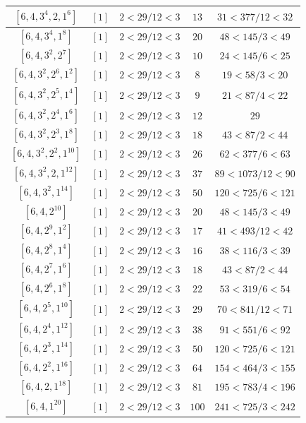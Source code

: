 \documentclass{article}%
\begin{document}
\begin{center}
\begin{longtable}{||c|c|c|c|c||}
$[6, 4, 3^{4}, 2, 1^{6}]$ & $[1]$ & $2 < 29/12 < 3$ & $13$ & $31 < 377/12 < 32$ \\ \hline 
$[6, 4, 3^{4}, 1^{8}]$ & $[1]$ & $2 < 29/12 < 3$ & $20$ & $48 < 145/3 < 49$ \\ \hline 
$[6, 4, 3^{2}, 2^{7}]$ & $[1]$ & $2 < 29/12 < 3$ & $10$ & $24 < 145/6 < 25$ \\ \hline 
$[6, 4, 3^{2}, 2^{6}, 1^{2}]$ & $[1]$ & $2 < 29/12 < 3$ & $8$ & $19 < 58/3 < 20$ \\ \hline 
$[6, 4, 3^{2}, 2^{5}, 1^{4}]$ & $[1]$ & $2 < 29/12 < 3$ & $9$ & $21 < 87/4 < 22$ \\ \hline 
$[6, 4, 3^{2}, 2^{4}, 1^{6}]$ & $[1]$ & $2 < 29/12 < 3$ & $12$ & $29$ \\ \hline 
$[6, 4, 3^{2}, 2^{3}, 1^{8}]$ & $[1]$ & $2 < 29/12 < 3$ & $18$ & $43 < 87/2 < 44$ \\ \hline 
$[6, 4, 3^{2}, 2^{2}, 1^{10}]$ & $[1]$ & $2 < 29/12 < 3$ & $26$ & $62 < 377/6 < 63$ \\ \hline 
$[6, 4, 3^{2}, 2, 1^{12}]$ & $[1]$ & $2 < 29/12 < 3$ & $37$ & $89 < 1073/12 < 90$ \\ \hline 
$[6, 4, 3^{2}, 1^{14}]$ & $[1]$ & $2 < 29/12 < 3$ & $50$ & $120 < 725/6 < 121$ \\ \hline 
$[6, 4, 2^{10}]$ & $[1]$ & $2 < 29/12 < 3$ & $20$ & $48 < 145/3 < 49$ \\ \hline 
$[6, 4, 2^{9}, 1^{2}]$ & $[1]$ & $2 < 29/12 < 3$ & $17$ & $41 < 493/12 < 42$ \\ \hline 
$[6, 4, 2^{8}, 1^{4}]$ & $[1]$ & $2 < 29/12 < 3$ & $16$ & $38 < 116/3 < 39$ \\ \hline 
$[6, 4, 2^{7}, 1^{6}]$ & $[1]$ & $2 < 29/12 < 3$ & $18$ & $43 < 87/2 < 44$ \\ \hline 
$[6, 4, 2^{6}, 1^{8}]$ & $[1]$ & $2 < 29/12 < 3$ & $22$ & $53 < 319/6 < 54$ \\ \hline 
$[6, 4, 2^{5}, 1^{10}]$ & $[1]$ & $2 < 29/12 < 3$ & $29$ & $70 < 841/12 < 71$ \\ \hline 
$[6, 4, 2^{4}, 1^{12}]$ & $[1]$ & $2 < 29/12 < 3$ & $38$ & $91 < 551/6 < 92$ \\ \hline 
$[6, 4, 2^{3}, 1^{14}]$ & $[1]$ & $2 < 29/12 < 3$ & $50$ & $120 < 725/6 < 121$ \\ \hline 
$[6, 4, 2^{2}, 1^{16}]$ & $[1]$ & $2 < 29/12 < 3$ & $64$ & $154 < 464/3 < 155$ \\ \hline 
$[6, 4, 2, 1^{18}]$ & $[1]$ & $2 < 29/12 < 3$ & $81$ & $195 < 783/4 < 196$ \\ \hline 
$[6, 4, 1^{20}]$ & $[1]$ & $2 < 29/12 < 3$ & $100$ & $241 < 725/3 < 242$ \\ \hline 

\end{longtable}
\end{center}
\end{document}
